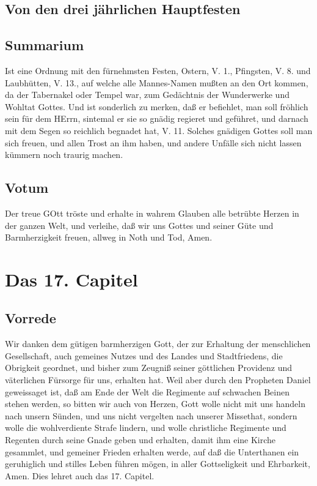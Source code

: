 \section{Von den drei jährlichen Hauptfesten}

\section{Summarium}

Ist eine Ordnung mit den fürnehmsten Festen, Ostern, V. 1., Pfingsten, V. 8. und Laubhütten, V. 13., auf welche alle Mannes-Namen mußten an den Ort kommen, da der Tabernakel oder Tempel war, zum Gedächtnis der Wunderwerke und Wohltat Gottes. Und ist sonderlich zu merken, daß er befiehlet, man soll fröhlich sein für dem HErrn, sintemal er sie so gnädig regieret und geführet, und darnach mit dem Segen so reichlich begnadet hat, V. 11. Solches gnädigen Gottes soll man sich freuen, und allen Trost an ihm haben, und andere Unfälle sich nicht lassen kümmern noch traurig machen.

\section{Votum}

Der treue GOtt tröste und erhalte in wahrem Glauben alle betrübte Herzen in der ganzen Welt, und verleihe, daß wir uns Gottes und seiner Güte und Barmherzigkeit freuen, allweg in Noth und Tod, Amen.

\chapter{Das 17. Capitel}

\section{Vorrede}

Wir danken dem gütigen barmherzigen Gott, der zur Erhaltung der menschlichen Gesellschaft, auch gemeines Nutzes und des Landes und Stadtfriedens, die Obrigkeit geordnet, und bisher zum Zeugniß seiner göttlichen Providenz und väterlichen Fürsorge für uns, erhalten hat. Weil aber durch den Propheten Daniel geweissaget ist, daß am Ende der Welt die Regimente auf schwachen Beinen stehen werden, so bitten wir auch von Herzen, Gott wolle nicht mit uns handeln nach unsern Sünden, und uns nicht vergelten nach unserer Missethat, sondern wolle die wohlverdiente Strafe lindern, und wolle christliche Regimente und Regenten durch seine Gnade geben und erhalten, damit ihm eine Kirche gesammlet, und gemeiner Frieden erhalten werde, auf daß die Unterthanen ein geruhiglich und stilles Leben führen mögen, in aller Gottseligkeit und Ehrbarkeit, Amen. Dies lehret auch das 17. Capitel.

